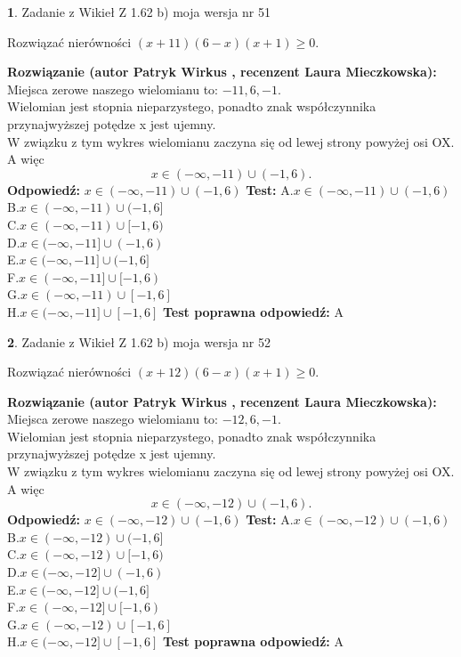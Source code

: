 \documentclass[12pt, a4paper]{article}
\theoremstyle{definition} %
\newtheorem{zad}{}
\newcommand{\zadStart}[1]{\begin{zad}#1\newline}
\newcommand{\zadStop}{\end{zad}}
\newcommand{\rozwStart}[2]{\noindent \textbf{Rozwiązanie (autor #1 , recenzent #2): }\newline}
\newcommand{\rozwStop}{\newline}
\newcommand{\odpStart}{\noindent \textbf{Odpowiedź:}\newline}
\newcommand{\odpStop}{\newline}
\newcommand{\testStart}{\noindent \textbf{Test:}\newline}
\newcommand{\testStop}{\newline}
\newcommand{\kluczStart}{\noindent \textbf{Test poprawna odpowiedź:}\newline}
\newcommand{\kluczStop}{\newline}
\begin{document}
\zadStart{Zadanie z Wikieł Z 1.62 b) moja wersja nr 51}

Rozwiązać nierówności $(x+11)(6-x)(x+1)\ge0$.
\zadStop
\rozwStart{Patryk Wirkus}{Laura Mieczkowska}
Miejsca zerowe naszego wielomianu to: $-11, 6, -1$.\\
Wielomian jest stopnia nieparzystego, ponadto znak współczynnika przy\linebreak najwyższej potędze x jest ujemny.\\ W związku z tym wykres wielomianu zaczyna się od lewej strony powyżej osi OX. A więc $$x \in (-\infty,-11) \cup (-1,6).$$
\rozwStop
\odpStart
$x \in (-\infty,-11) \cup (-1,6)$
\odpStop
\testStart
A.$x \in (-\infty,-11) \cup (-1,6)$\\
B.$x \in (-\infty,-11) \cup (-1,6]$\\
C.$x \in (-\infty,-11) \cup [-1,6)$\\
D.$x \in (-\infty,-11] \cup (-1,6)$\\
E.$x \in (-\infty,-11] \cup (-1,6]$\\
F.$x \in (-\infty,-11] \cup [-1,6)$\\
G.$x \in (-\infty,-11) \cup [-1,6]$\\
H.$x \in (-\infty,-11] \cup [-1,6]$
\testStop
\kluczStart
A
\kluczStop



\zadStart{Zadanie z Wikieł Z 1.62 b) moja wersja nr 52}

Rozwiązać nierówności $(x+12)(6-x)(x+1)\ge0$.
\zadStop
\rozwStart{Patryk Wirkus}{Laura Mieczkowska}
Miejsca zerowe naszego wielomianu to: $-12, 6, -1$.\\
Wielomian jest stopnia nieparzystego, ponadto znak współczynnika przy\linebreak najwyższej potędze x jest ujemny.\\ W związku z tym wykres wielomianu zaczyna się od lewej strony powyżej osi OX. A więc $$x \in (-\infty,-12) \cup (-1,6).$$
\rozwStop
\odpStart
$x \in (-\infty,-12) \cup (-1,6)$
\odpStop
\testStart
A.$x \in (-\infty,-12) \cup (-1,6)$\\
B.$x \in (-\infty,-12) \cup (-1,6]$\\
C.$x \in (-\infty,-12) \cup [-1,6)$\\
D.$x \in (-\infty,-12] \cup (-1,6)$\\
E.$x \in (-\infty,-12] \cup (-1,6]$\\
F.$x \in (-\infty,-12] \cup [-1,6)$\\
G.$x \in (-\infty,-12) \cup [-1,6]$\\
H.$x \in (-\infty,-12] \cup [-1,6]$
\testStop
\kluczStart
A
\kluczStop
\end{document}

